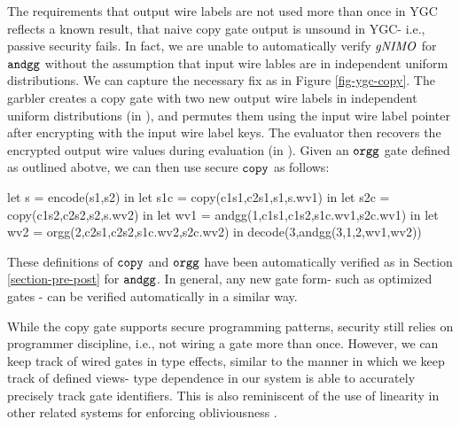 The requirements that output wire labels are not used more than once
in YGC reflects a known result, that naive copy gate output is unsound
in YGC- i.e., passive security fails. In fact, we are unable to
automatically verify $\mathit{gNIMO}$ for $\texttt{andgg}$ without the assumption
that input wire lables are in independent uniform distributions. We
can capture the necessary fix as in Figure \ref{fig-ygc-copy}. The
garbler creates a copy gate with two new output wire labels in
independent uniform distributions (in ), and permutes
them using the input wire label pointer after encrypting with the
input wire label keys. The evaluator then recovers the encrypted
output wire values during evaluation (in ). Given an
$\texttt{orgg}$ gate defined as outlined abotve, we can then use secure
$\texttt{copy}$ as follows:
\begin{verbatimtab}
  let s = encode(s1,s2) in
  let s1c = copy(c1s1,c2s1,s1,s.wv1) in
  let s2c = copy(c1s2,c2s2,s2,s.wv2) in
  let wv1 = andgg(1,c1s1,c1s2,s1c.wv1,s2c.wv1) in
  let wv2 = orgg(2,c2s1,c2s2,s1c.wv2,s2c.wv2) in
  decode(3,andgg(3,1,2,wv1,wv2))
\end{verbatimtab}
These definitions of $\texttt{copy}$ and $\texttt{orgg}$ have been
automatically verified as in Section \ref{section-pre-post} for
$\texttt{andgg}$. In general, any new gate form- such as optimized gates
\cite{XXX}- can be verified automatically in a similar way.

While the copy gate supports secure programming patterns, security
still relies on programmer discipline, i.e., not wiring a gate more
than once. However, we can keep track of wired gates in type effects,
similar to the manner in which we keep track of defined views- type
dependence in our system is able to accurately precisely track
gate identifiers. This is also reminiscent of the use of linearity
in other related systems for enforcing obliviousness \cite{darais2019language}. 


